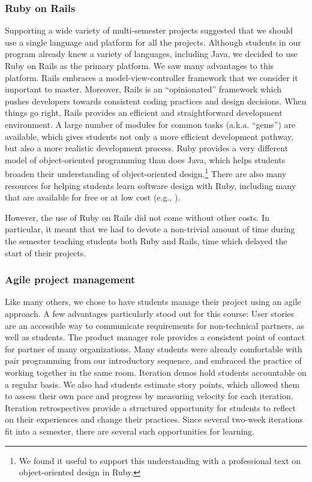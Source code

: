 
\subsubsection{Ruby on Rails}

Supporting a wide variety of multi-semester projects suggested that
we should use a single language and platform for all the
projects.
Although students in our program already knew
a variety of languages, including Java, we decided to use Ruby on
Rails as the primary platform.  We saw many advantages to this
platform. Rails embraces a model-view-controller framework that we
consider it important to master. Moreover, Rails is an ``opinionated'' framework
which pushes developers towards consistent coding practices and
design decisions.  When things go right, Rails provides an efficient
and straightforward development environment.  A large number of
modules for common tasks (a.k.a. ``gems'') are available, which
gives students not only a more efficient development pathway, but
also a more realistic development process. Ruby provides a very
different model of object-oriented programming than does Java, which
helps students broaden their understanding of object-oriented
design.\footnote{We found it useful to support this understanding
with a professional text on object-oriented design in Ruby.\cite{poodr}}
There are also many resources for helping students
learn software design with Ruby, including many that are available
for free or at low cost (e.g., \cite{saasbook,rails-tutorial}).

However, the use of Ruby on Rails did not come without other costs.  In
particular, it meant that we had to devote a non-trivial amount of
time during the semester teaching students both Ruby and Rails, time
which delayed the start of their projects.

\subsubsection{Agile project management}

Like many others, we chose to have students manage their project using an 
agile approach.  A few advantages particularly stood out
for this course: User stories are an accessible way to communicate
requirements for non-technical partners, as well as students. 
The product manager role provides a consistent point of contact for partner 
of many organizations.
Many students were already comfortable with pair programming from our 
introductory sequence, and embraced the 
practice of working together in the same room.
Iteration demos hold students accountable on a regular basis.  
We also had students estimate story points, which allowed them to assess 
their own pace and progress by measuring velocity for each iteration.
Iteration retrospectives provide a structured opportunity for students 
to reflect on their experiences and change their practices.  
Since several two-week iterations fit into a 
semester, there are several such opportunities for learning.

